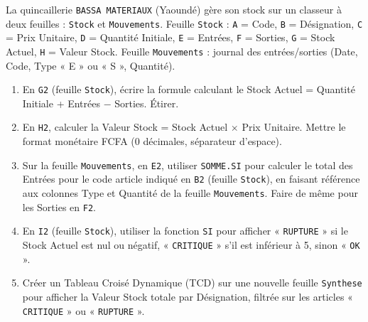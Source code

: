 \documentclass[11pt]{article}
\begin{document}
\begin{exercice}
La quincaillerie \texttt{BASSA MATERIAUX} (Yaoundé) gère son stock sur un classeur à deux feuilles : \texttt{Stock} et \texttt{Mouvements}.
Feuille \texttt{Stock} : \texttt{A} = Code, \texttt{B} = Désignation, \texttt{C} = Prix Unitaire, \texttt{D} = Quantité Initiale, \texttt{E} = Entrées, \texttt{F} = Sorties, \texttt{G} = Stock Actuel, \texttt{H} = Valeur Stock.
Feuille \texttt{Mouvements} : journal des entrées/sorties (Date, Code, Type « E » ou « S », Quantité).
\begin{enumerate}
    \item En \texttt{G2} (feuille \texttt{Stock}), écrire la formule calculant le Stock Actuel = Quantité Initiale + Entrées $-$ Sorties. Étirer.
    \item En \texttt{H2}, calculer la Valeur Stock = Stock Actuel $\times$ Prix Unitaire. Mettre le format monétaire FCFA (0 décimales, séparateur d'espace).
    \item Sur la feuille \texttt{Mouvements}, en \texttt{E2}, utiliser \texttt{SOMME.SI} pour calculer le total des Entrées pour le code article indiqué en \texttt{B2} (feuille \texttt{Stock}), en faisant référence aux colonnes Type et Quantité de la feuille \texttt{Mouvements}. Faire de même pour les Sorties en \texttt{F2}.
    \item En \texttt{I2} (feuille \texttt{Stock}), utiliser la fonction \texttt{SI} pour afficher « \texttt{RUPTURE} » si le Stock Actuel est nul ou négatif, « \texttt{CRITIQUE} » s'il est inférieur à 5, sinon « \texttt{OK} ».
    \item Créer un Tableau Croisé Dynamique (TCD) sur une nouvelle feuille \texttt{Synthese} pour afficher la Valeur Stock totale par Désignation, filtrée sur les articles « \texttt{CRITIQUE} » ou « \texttt{RUPTURE} ».
\end{enumerate}
\end{exercice}
\end{document}

